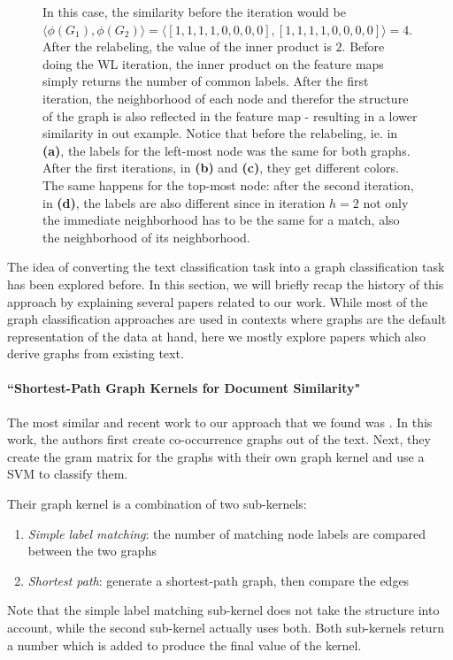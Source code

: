 \begin{figure}[htb!]
{  In this case, the similarity before the iteration would be $\langle \phi(G_1), \phi(G_2) \rangle = \langle [1, 1, 1, 1, 0, 0, 0, 0], [1, 1, 1, 1, 0, 0, 0, 0] \rangle = 4$. After the relabeling, the value of the inner product is $2$.
  Before doing the WL iteration, the inner product on the feature maps simply returns the number of common labels. After the first iteration, the neighborhood of each node and therefor the structure of the graph is also reflected in the feature map - resulting in a lower similarity in out example.
  Notice that before the relabeling, ie. in \textbf{(a)}, the labels for the left-most node was the same for both graphs. After the first iterations, in \textbf{(b)} and \textbf{(c)}, they get different colors.
  The same happens for the top-most node: after the second iteration, in \textbf{(d)}, the labels are also different since in iteration $h=2$ not only the immediate neighborhood has to be the same for a match, also the neighborhood of its neighborhood.}
	\label{fig:wl_example}
\end{figure}

The idea of converting the text classification task into a graph classification task has been explored before.
In this section, we will briefly recap the history of this approach by explaining several papers related to our work.
While most of the graph classification approaches are used in contexts where graphs are the default representation of the data at hand, here we mostly explore papers which also derive graphs from existing text.


\paragraph{``Shortest-Path Graph Kernels for Document Similarity" \cite{Nikolentzos2017}}
The most similar and recent work to our approach that we found was \cite{Nikolentzos2017}. In this work, the authors first create co-occurrence graphs out of the text. Next, they create the gram matrix for the graphs with their own graph kernel and use a SVM to classify them.

Their graph kernel is a combination of two sub-kernels:
\begin{enumerate}
    \item{\textit{Simple label matching}: the number of matching node labels are compared between the two graphs}
    \item{\textit{Shortest path}: generate a shortest-path graph, then compare the edges}
\end{enumerate}
Note that the simple label matching sub-kernel does not take the structure into account, while the second sub-kernel actually uses both.
Both sub-kernels return a number which is added to produce the final value of the kernel.

